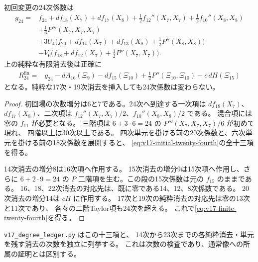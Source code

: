 \begin{proposition}[二十四次の正確な有限補正式]
\label{prop:v17-exact-twenty-fourth-correction}
初回変更の24次係数は
\begin{equation}\label{eq:v17-initial-twenty-fourth}
\begin{split}
 g_{24}={}&f_{24}+df_{18}(X_7)+df_{17}(X_8)
       +\tfrac12 f_{12}''(X_7,X_7)+\tfrac12 f_{10}''(X_8,X_8)\\
 &+\tfrac16P'''(X_7,X_7,X_7)\\
 &+3U_4\bigl(f_{20}+df_{14}(X_7)+df_{13}(X_8)
                         +\tfrac12P''(X_8,X_8)\bigr)\\
 &-V_6\bigl(f_{18}+df_{12}(X_7)+\tfrac12P''(X_7,X_7)\bigr).
\end{split}
\end{equation}
上の純粋な有限消去後は正確に
\begin{equation}\label{eq:v17-finite-twenty-fourth}
\begin{split}
 R_{24}^{\mathrm{fin}}={}&g_{24}-dA_{16}(\Xi_9)-df_{15}(\Xi_{10})
                  +\tfrac12P''(\Xi_{10},\Xi_{10})
                  -c\,dH(\Xi_{15})
\end{split}
\end{equation}
となる。純粋な17次・19次消去を挿入しても24次係数は変わらない。
\end{proposition}

\begin{proof}
初回場の次数増分は6と7である。24次へ到達する一次項は
$df_{18}(X_7)$、$df_{17}(X_8)$、二次項は
$f_{12}''(X_7,X_7)/2$、$f_{10}''(X_8,X_8)/2$ である。
混合項には零の $f_{11}$ が必要となる。
三階項は $6+3\cdot6=24$ の $P'''(X_7,X_7,X_7)/6$ が初めて現れ、
四階以上は30次以上である。
四次単元を掛ける前の20次係数と、六次単元を掛ける前の18次係数を展開すると、
\eqref{eq:v17-initial-twenty-fourth}の全十三項を得る。

14次消去の増分8は16次項へ作用する。
15次消去の増分9は15次項へ作用し、さらに $6+2\cdot9=24$ の
$P$ 二階項を生む。この段の15次係数は元の $f_{15}$ のままである。
16、18、22次消去の対応先は、既に零である14、12、8次係数である。
20次消去の増分14は $cH$ に作用する。
17次と19次の純粋消去の対応先は零の13次と11次であり、
各々の二階Taylor項も24次を超える。
これで\eqref{eq:v17-finite-twenty-fourth}を得る。
\end{proof}

\nolinkurl{v17_degree_ledger.py} はこの十三項と、
14次から23次までの各純粋消去・単元を残す消去の次数を独立に列挙する。
これは次数の検査であり、通常像への所属の証明とは区別する。


